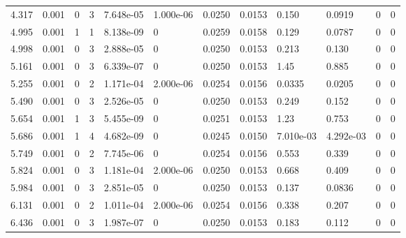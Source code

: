 \documentclass[preview]{standalone}
\begin{document}
{{\begin{tabular}{L{1.2cm}C{1.2cm} C{0.3cm}C{0.5cm} C{1.4cm}C{1.4cm} C{1.4cm}C{1.4cm} C{1.6cm}C{1.6cm} C{1.6cm}C{1.6cm}}
  4.317  &  0.001  & 0     &  3 &  7.648e-05  & 1.000e-06  &  0.0250&   0.0153& 0.150 & 0.0919   &  0 & 0  \\ 
  4.995  &  0.001  & 1     &  1 &  8.138e-09  & 0  &  0.0259&   0.0158& 0.129 & 0.0787   &  0 & 0  \\ 
  4.998  &  0.001  & 0     &  3 &  2.888e-05  & 0  &  0.0250&   0.0153& 0.213 & 0.130   &  0 & 0  \\ 
  5.161  &  0.001  & 0     &  3 &  6.339e-07  & 0  &  0.0250&   0.0153& 1.45 & 0.885   &  0 & 0  \\ 
  5.255  &  0.001  & 0     &  2 &  1.171e-04  & 2.000e-06  &  0.0254&   0.0156& 0.0335 & 0.0205   &  0 & 0  \\ 
  5.490  &  0.001  & 0     &  3 &  2.526e-05  & 0  &  0.0250&   0.0153& 0.249 & 0.152   &  0 & 0  \\ 
  5.654  &  0.001  & 1     &  3 &  5.455e-09  & 0  &  0.0251&   0.0153& 1.23 & 0.753   &  0 & 0  \\ 
  5.686  &  0.001  & 1     &  4 &  4.682e-09  & 0  &  0.0245&   0.0150& 7.010e-03 & 4.292e-03   &  0 & 0  \\ 
  5.749  &  0.001  & 0     &  2 &  7.745e-06  & 0  &  0.0254&   0.0156& 0.553 & 0.339   &  0 & 0  \\ 
  5.824  &  0.001  & 0     &  3 &  1.181e-04  & 2.000e-06  &  0.0250&   0.0153& 0.668 & 0.409   &  0 & 0  \\ 
  5.984  &  0.001  & 0     &  3 &  2.851e-05  & 0  &  0.0250&   0.0153& 0.137 & 0.0836   &  0 & 0  \\ 
  6.131  &  0.001  & 0     &  2 &  1.011e-04  & 2.000e-06  &  0.0254&   0.0156& 0.338 & 0.207   &  0 & 0  \\ 
  6.436  &  0.001  & 0     &  3 &  1.987e-07  & 0  &  0.0250&   0.0153& 0.183 & 0.112   &  0 & 0  \\ 
\hline 
\end{tabular} 

}}
\end{document}

